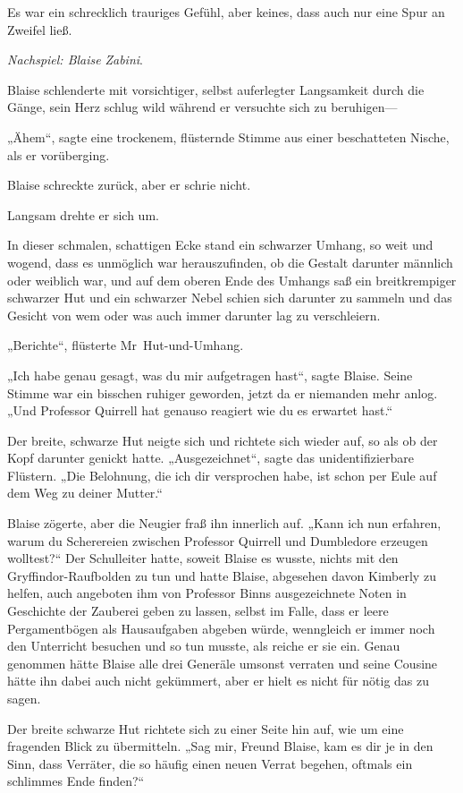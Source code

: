 {Es war ein schrecklich trauriges Gefühl, aber keines, dass auch nur eine Spur an Zweifel ließ.

\emph{Nachspiel: Blaise} \emph{Zabini}.

Blaise schlenderte mit vorsichtiger, selbst auferlegter Langsamkeit durch die Gänge, sein Herz schlug wild während er versuchte sich zu beruhigen—

„Ähem“, sagte eine trockenem, flüsternde Stimme aus einer beschatteten Nische, als er vorüberging.

Blaise schreckte zurück, aber er schrie nicht.

Langsam drehte er sich um.

In dieser schmalen, schattigen Ecke stand ein schwarzer Umhang, so weit und wogend, dass es unmöglich war herauszufinden, ob die Gestalt darunter männlich oder weiblich war, und auf dem oberen Ende des Umhangs saß ein breitkrempiger schwarzer Hut und ein schwarzer Nebel schien sich darunter zu sammeln und das Gesicht von wem oder was auch immer darunter lag zu verschleiern.

„Berichte“, flüsterte Mr~Hut-und-Umhang.

„Ich habe genau gesagt, was du mir aufgetragen hast“, sagte Blaise. Seine Stimme war ein bisschen ruhiger geworden, jetzt da er niemanden mehr anlog. „Und Professor Quirrell hat genauso reagiert wie du es erwartet hast.“

Der breite, schwarze Hut neigte sich und richtete sich wieder auf, so als ob der Kopf darunter genickt hatte. „Ausgezeichnet“, sagte das unidentifizierbare Flüstern. „Die Belohnung, die ich dir versprochen habe, ist schon per Eule auf dem Weg zu deiner Mutter.“

Blaise zögerte, aber die Neugier fraß ihn innerlich auf. „Kann ich nun erfahren, warum du Scherereien zwischen Professor Quirrell und Dumbledore erzeugen wolltest?“ Der Schulleiter hatte, soweit Blaise es wusste, nichts mit den Gryffindor-Raufbolden zu tun und hatte Blaise, abgesehen davon Kimberly zu helfen, auch angeboten ihm von Professor Binns ausgezeichnete Noten in Geschichte der Zauberei geben zu lassen, selbst im Falle, dass er leere Pergamentbögen als Hausaufgaben abgeben würde, wenngleich er immer noch den Unterricht besuchen und so tun musste, als reiche er sie ein. Genau genommen hätte Blaise alle drei Generäle umsonst verraten und seine Cousine hätte ihn dabei auch nicht gekümmert, aber er hielt es nicht für nötig das zu sagen.

Der breite schwarze Hut richtete sich zu einer Seite hin auf, wie um eine fragenden Blick zu übermitteln. „Sag mir, Freund Blaise, kam es dir je in den Sinn, dass Verräter, die so häufig einen neuen Verrat begehen, oftmals ein schlimmes Ende finden?“

}
